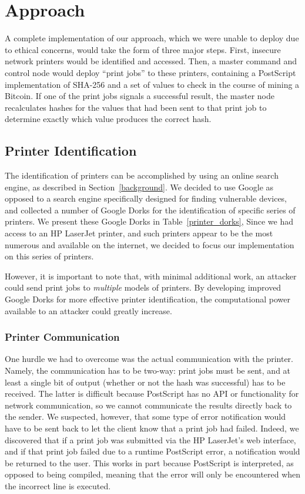 \section{Approach}

A complete implementation of our approach, which we were unable to deploy due to ethical concerns, would take the form of three major steps.
First, insecure network printers would be identified and accessed.
Then, a master command and control node would deploy ``print jobs'' to these printers, containing a PostScript implementation of SHA-256 and a set of values to check in the course of mining a Bitcoin.
If one of the print jobs signals a successful result, the master node recalculates hashes for the values that had been sent to that print job to determine exactly which value produces the correct hash.

\subsection{Printer Identification}

The identification of printers can be accomplished by using an online search engine, as described in Section~\ref{background}.
We decided to use Google as opposed to a search engine specifically designed for finding vulnerable devices, and collected a number of Google Dorks for the identification of specific series of printers.
We present these Google Dorks in Table~\ref{printer_dorks}, 
Since we had access to an HP LaserJet printer, and such printers appear to be the most numerous and available on the internet, we decided to focus our implementation on this series of printers.

However, it is important to note that, with minimal additional work, an attacker could send print jobs to \emph{multiple} models of printers.
By developing improved Google Dorks for more effective printer identification, the computational power available to an attacker could greatly increase.

\subsubsection{Printer Communication}

One hurdle we had to overcome was the actual communication with the printer.
Namely, the communication has to be two-way: print jobs must be sent, and at least a single bit of output (whether or not the hash was successful) has to be received.
The latter is difficult because PostScript has no API or functionality for network communication, so we cannot communicate the results directly back to the sender.
We suspected, however, that some type of error notification would have to be sent back to let the client know that a print job had failed.
Indeed, we discovered that if a print job was submitted via the HP LaserJet's web interface, and if that print job failed due to a runtime PostScript error, a notification would be returned to the user.
This works in part because PostScript is interpreted, as opposed to being compiled, meaning that the error will only be encountered when the incorrect line is executed.


